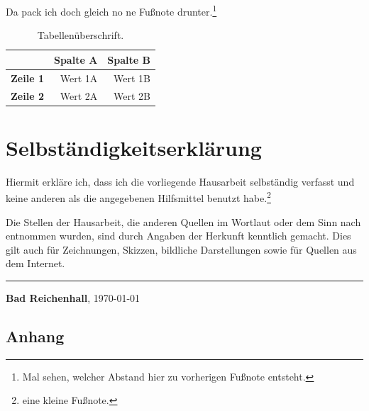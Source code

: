 Da pack ich doch gleich no ne Fußnote drunter.\footnote{Mal sehen, welcher Abstand hier zu vorherigen Fußnote entsteht.}

\lipsum[10]

\begin{table}[!ht]					%
\centering							%
\caption[YYY]{Tabellenüberschrift.}\vspace{0.8em} %
\label{tab:2}							%
\begin{tabular}{l|r|r} \toprule		%
  & \textbf{Spalte A} & \textbf{Spalte B} \\ \midrule 				%
\textbf{Zeile 1} & Wert 1A & Wert 1B \\
\textbf{Zeile 2 }& Wert 2A & Wert 2B \\ \bottomrule		%
\end{tabular}
\end{table}

\lipsum[41]


\newpage
\section{Selbständigkeitserklärung}
Hiermit erkläre ich, dass ich die vorliegende Hausarbeit selbständig verfasst und keine anderen als die angegebenen Hilfsmittel benutzt habe.\footnote{eine kleine Fußnote.}

Die Stellen der Hausarbeit, die anderen Quellen im Wortlaut oder dem Sinn nach entnommen wurden, sind durch Angaben der Herkunft kenntlich gemacht. Dies gilt auch für Zeichnungen, Skizzen, bildliche Darstellungen sowie für Quellen aus dem Internet.

\vspace{20mm}
\hrule
\vspace{5mm}
\begin{center}
\textbf{Bad Reichenhall}, \today
\end{center}


\newpage
\listoffigures		%

\newpage
\listoftables		%

\newpage
{}
\small 						%


\newpage
\appendix
{}
\begin{appendix}
\section*{Anhang}
\end{appendix}
